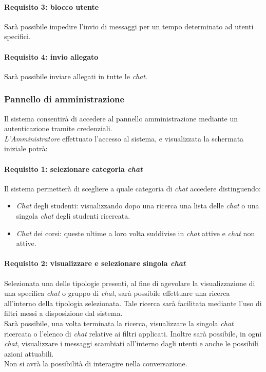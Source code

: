 \paragraph{Requisito 3: blocco utente\\}
Sarà possibile impedire l’invio di messaggi per un tempo determinato ad utenti specifici.

\paragraph{Requisito 4: invio allegato\\}
Sarà possibile inviare allegati in tutte le \emph{chat}.


\subsubsection{Pannello di amministrazione}
Il sistema consentirà di accedere al pannello amministrazione mediante un autenticazione tramite credenziali.\\
\emph{L’Amministratore} effettuato l’accesso al sistema, e visualizzata la schermata iniziale potrà:

\paragraph{Requisito 1: selezionare categoria \emph{chat}\\}
Il sistema permetterà di scegliere a quale categoria di \emph{chat} accedere distinguendo: 
\begin{itemize}
	\item \emph{Chat} degli studenti: visualizzando dopo una ricerca una lista delle \emph{chat} o una singola \emph{chat} degli studenti ricercata.
	\item \emph{Chat} dei corsi: queste ultime a loro volta suddivise in \emph{chat} attive e \emph{chat} non attive.
\end{itemize}

\paragraph{Requisito 2: visualizzare e selezionare singola \emph{chat}\\}
Selezionata una delle tipologie presenti, al fine di agevolare la visualizzazione di una specifica \emph{chat} o gruppo di \emph{chat}, sarà possibile effettuare una ricerca all’interno della tipologia selezionata. Tale ricerca sarà facilitata mediante l’uso di filtri messi a disposizione dal sistema.\\
Sarà possibile, una volta terminata la ricerca, visualizzare la singola \emph{chat} ricercata o l’elenco di \emph{chat} relative ai filtri applicati.
Inoltre sarà possibile, in ogni \emph{chat}, visualizzare i messaggi scambiati all’interno dagli utenti e anche le possibili azioni attuabili.\\
Non si avrà la possibilità di interagire nella conversazione.

